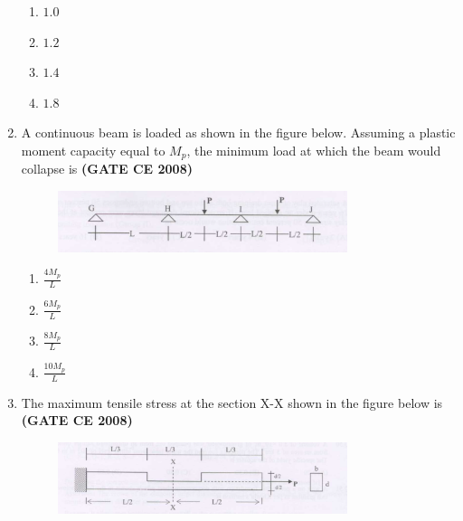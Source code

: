 \documentclass[journal]{IEEEtran}
\begin{document}
\begin{enumerate}
\begin{enumerate}
\item $1.0$
\item $1.2$
\item $1.4$
\item $1.8$
\end{enumerate}

\item A continuous beam is loaded as shown in the figure below. Assuming a plastic moment capacity equal to $M_p$, the minimum load at which the beam would collapse is \textbf{(GATE CE 2008)}

\begin{figure}[h]
    \centering
    \includegraphics[width=0.8\textwidth]{image/image1.png} 

\end{figure}
\begin{multicols}{2}

\begin{enumerate}
\item $\frac{4M_p}{L}$
\vspace{0.1cm}
\item $\frac{6M_p}{L}$
\item $\frac{8M_p}{L}$
\vspace{0.1cm}
\item $\frac{10M_p}{L}$
\end{enumerate}     
\end{multicols}

\item The maximum tensile stress at the section X-X shown in the figure below is \textbf{(GATE CE 2008)}

\begin{figure}[h]
    \centering
    \includegraphics[width=0.8\textwidth]{image/image2.png} 

\end{figure}
\begin{multicols}{2}


\end{multicols}
\end{enumerate}
\end{document}
